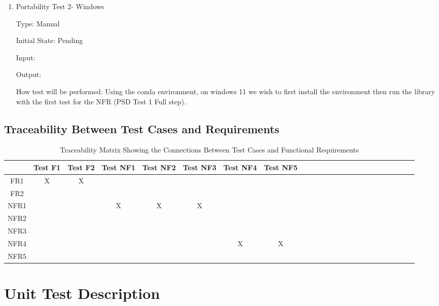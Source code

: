 \documentclass[12pt, titlepage]{article}
\begin{document}
\begin{enumerate}
\item{Portability Test 2- Windows\\}

Type: Manual 
					
Initial State: Pending
					
Input: 
					
Output: 
					
How test will be performed: Using the conda environment, on windows 11
we wish to first install the environment then run the library with the first test for the 
NFR (PSD Test 1 Full step).

\end{enumerate}

\subsection{Traceability Between Test Cases and Requirements}
\begin{table}[h!]
  \centering
  \begin{tabular}{|c|c|c|c|c|c|c|c|c|c|c|c|c|c|c|c|c|c|c|c|c|c|c|c|}
  \hline        
    & Test F1& Test F2 & Test NF1 & Test NF2& Test NF3 & Test NF4& Test NF5\\
  \hline
  FR1                    &X &X & & & & & \\ \hline
  FR2        & & & & & & &  \\ \hline
  NFR1      & & &X &X &X & &  \\ \hline
  NFR2 & & & & & & &  \\ \hline
  NFR3  & & & & & & &  \\ \hline
  NFR4    & & & & & &X &X \\ \hline
  NFR5     & & & & &  & &  \\ \hline
  
  \end{tabular}
  \caption{Traceability Matrix Showing the Connections Between Test Cases and Functional Requirements}
  \label{Table:trace}
  \end{table}

\iffalse 
\section{Unit Test Description}


\end{document}
